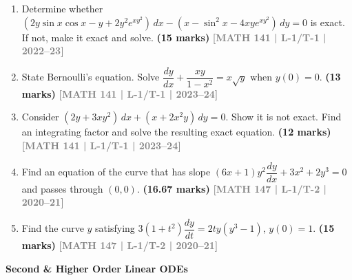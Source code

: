 \documentclass[12pt,a4paper]{article}
\newcommand{\yr}[1]{\hfill\textcolor{gray}{\small\textbf{[#1]}}}
\newcommand{\mk}[1]{\textcolor{orange!70!black}{\small\textbf{(#1 marks)}}}
\newcommand{\subtopic}[2]{%
  \vspace{10pt}
  \noindent\begin{tcolorbox}[colback=#1!8,colframe=#1,boxrule=0.6pt,arc=4pt,
    left=6pt,right=6pt,top=4pt,bottom=4pt]
    \small\bfseries\textcolor{#1}{#2}
  \end{tcolorbox}
  \vspace{2pt}
}
\begin{document}
\begin{enumerate}
\item Determine whether $(2y\sin x\cos x-y+2y^{2}e^{xy^{2}})\,dx-(x-\sin^{2}x-4xye^{xy^{2}})\,dy=0$ is exact. If not, make it exact and solve.
\mk{15} \yr{MATH 141 | L-1/T-1 | 2022--23}

\item State Bernoulli's equation. Solve $\dfrac{dy}{dx}+\dfrac{xy}{1-x^{2}}=x\sqrt{y}$ when $y(0)=0$.
\mk{13} \yr{MATH 141 | L-1/T-1 | 2023--24}

\item Consider $(2y+3xy^{2})\,dx+(x+2x^{2}y)\,dy=0$. Show it is not exact. Find an integrating factor and solve the resulting exact equation.
\mk{12} \yr{MATH 141 | L-1/T-1 | 2023--24}

\item Find an equation of the curve that has slope $(6x+1)y^{2}\dfrac{dy}{dx}+3x^{2}+2y^{3}=0$ and passes through $(0,0)$.
\mk{16.67} \yr{MATH 147 | L-1/T-2 | 2020--21}

\item Find the curve $y$ satisfying $3(1+t^{2})\dfrac{dy}{dt}=2ty(y^{3}-1)$, $y(0)=1$.
\mk{15} \yr{MATH 147 | L-1/T-2 | 2020--21}

\end{enumerate}

\subtopic{cC}{Second \& Higher Order Linear ODEs}
\label{sub:s3-linear}
\end{document}
